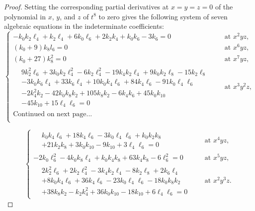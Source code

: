 \documentclass[14pt, dvipsnames]{extarticle}
\theoremstyle{definition}
\theoremstyle{definition}
\theoremstyle{remark}
\begin{document}
\begin{proof}
Setting the corresponding partial derivatives at $x = y = z = 0$ of the polynomial in $x$, $y$, and $z$ of $t^8$ to zero gives the following system of seven algebraic equations in the indeterminate coefficients:
 \begin{equation}\label{big_system}\left\{ \begin{aligned}
-k_0 k_2 \ell_4+k_2 \ell_4+6 k_0 \ell_6+2 k_2 k_4+k_0 k_6-3 k_6 = 0 &\text{ $\;$ at }x^{2}yz,\\
\left(k_0+9\right) k_8 l_6 = 0 &\text{  $\;$ at }x^{6}yz,\\
\left(k_{0}+27\right)k_{8}^{2} =0 &\text{  $\;$ at }x^{7}yz,\\
 \begin{aligned}&9k_{2}^{2}\ell_{6}+3k_{0}k_{2}\ell_{4}^{2}-6k_{2}\ell_{4}^{2}-19k_{4}k_{2}\ell_{4}+9k_{0}k_{2}\ell_{8}-15k_{2}\ell_{8} \\ &-3k_{0}k_{6}\ell_{4}+33k_{6}\ell_{4}+10k_{0}k_{4}\ell_{6}+84k_{4}\ell_{6}-91k_{0}\ell_{4}\ell_{6} \\ &-2k_{4}^{2}k_{2}-42k_{0}k_{8}k_{2}+105k_{8}k_{2}-6k_{4}k_{6}+45k_{0}k_{10}\\ &-45k_{10}+15\ell_{4}\ell_{6} = 0\end{aligned} &\text{  $\;$ at }x^{3}y^{2}z,\\
\text{Continued on next page...}\\
\end{aligned}\right.
\end{equation}

\begin{equation*}\left\{ \begin{aligned}
\begin{aligned}&k_{0}k_{4}\ell_{6}+18k_{4}\ell_{6}-3k_{0}\ell_{4}\ell_{6}+k_{0}k_{2}k_{8} \\ &+21k_{2}k_{8}+3k_{0}k_{10}-9k_{10}+3\ell_{4}\ell_{6} = 0\end{aligned} &\text{  $\;$ at }x^{4}yz,\\
-2k_{0}\ell_{6}^{2}-4k_{0}k_{8}\ell_{4}+k_{0}k_{4}k_{8}+63k_{4}k_{8}-6\ell_{6}^{2} =0 &\text{  $\;$ at }x^{5}yz,\\
\begin{aligned}&2 k_2^2 \ell_6+2 k_2 \ell_4^2-3 k_4 k_2 \ell_4-8 k_2 \ell_8+2 k_6 \ell_4\\ &+8 k_0 k_4 \ell_6+36 k_4 \ell_6-23 k_0 \ell_4 \ell_6-18 k_0 k_8 k_2\\ &+38 k_8 k_2-k_2 k_4^2+36 k_0 k_{10}-18 k_{10}+6 \ell_4 \ell_6 = 0\end{aligned} &\text{  $\;$ at }x^{2}y^{3}z.
\end{aligned}\right.
\end{equation*}



\end{proof}
\end{document}
